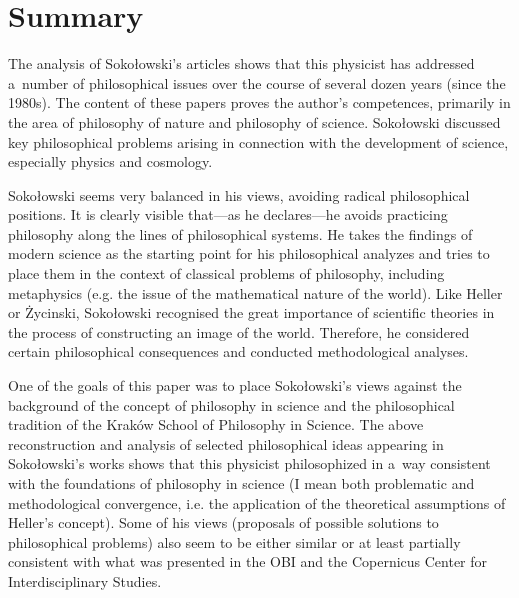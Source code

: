 \documentclass[%
  manuscript=article,
  year=2024,
  volume=77,
  doi=00000.000,
]{zfn}
\begin{document}
\section{Summary}

The analysis of Sokołowski's articles shows that this physicist has addressed a~number of philosophical issues over the course of several dozen years (since the 1980s). The content of these papers proves the author's competences, primarily in the area of philosophy of nature and philosophy of science. Sokołowski discussed key philosophical problems arising in connection with the development of science, especially physics and cosmology.



Sokołowski seems very balanced in his views, avoiding radical philosophical positions. It is clearly visible that---as he declares---he avoids practicing philosophy along the lines of philosophical systems. He takes the findings of modern science as the starting point for his philosophical analyzes and tries to place them in the context of classical problems of philosophy, including metaphysics (e.g. the issue of the mathematical nature of the world). Like Heller or Życinski, Sokołowski recognised the great importance of scientific theories in the process of constructing an image of the world. Therefore, he considered certain philosophical consequences and conducted methodological analyses.



One of the goals of this paper was to place Sokołowski's views against the background of the concept of philosophy in science and the philosophical tradition of the Kraków School of Philosophy in Science. The above reconstruction and analysis of selected philosophical ideas appearing in Sokołowski's works shows that this physicist philosophized in a~way consistent with the foundations of philosophy in science (I mean both problematic and methodological convergence, i.e. the application of the theoretical assumptions of Heller's concept). Some of his views (proposals of possible solutions to philosophical problems) also seem to be either similar or at least partially consistent with what was presented in the OBI and the Copernicus Center for Interdisciplinary Studies.
\end{document}
